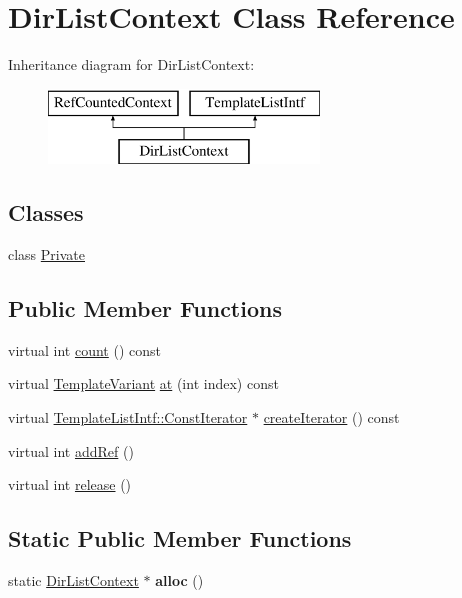 \hypertarget{class_dir_list_context}{}\section{Dir\+List\+Context Class Reference}
\label{class_dir_list_context}
Inheritance diagram for Dir\+List\+Context\+:\begin{figure}[H]
\begin{center}
\leavevmode
\includegraphics[height=2.000000cm]{class_dir_list_context}
\end{center}
\end{figure}
\subsection*{Classes}
\begin{DoxyCompactItemize}
\item 
class \mbox{\hyperlink{class_dir_list_context_1_1_private}{Private}}
\end{DoxyCompactItemize}
\subsection*{Public Member Functions}
\begin{DoxyCompactItemize}
\item 
virtual int \mbox{\hyperlink{class_dir_list_context_ac8c79425ffe533916c0e388e49ebbfb6}{count}} () const
\item 
virtual \mbox{\hyperlink{class_template_variant}{Template\+Variant}} \mbox{\hyperlink{class_dir_list_context_a945ceb92b9e8b4f8a825f283d577eef0}{at}} (int index) const
\item 
virtual \mbox{\hyperlink{class_template_list_intf_1_1_const_iterator}{Template\+List\+Intf\+::\+Const\+Iterator}} $\ast$ \mbox{\hyperlink{class_dir_list_context_a5232d5fdd257a935a949c5ed52681bcb}{create\+Iterator}} () const
\item 
virtual int \mbox{\hyperlink{class_dir_list_context_abdf1dfce3d1e7693c50080226603e121}{add\+Ref}} ()
\item 
virtual int \mbox{\hyperlink{class_dir_list_context_a138217a1757cf808ffa7eeb9fb051855}{release}} ()
\end{DoxyCompactItemize}
\subsection*{Static Public Member Functions}
\begin{DoxyCompactItemize}
\item 
\mbox{\label{class_dir_list_context_a225747eeee1d99b43a88618a455d8f2d}} 
static \mbox{\hyperlink{class_dir_list_context}{Dir\+List\+Context}} $\ast$ {\bfseries alloc} ()
\end{DoxyCompactItemize}


